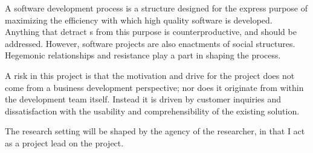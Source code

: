 A software development process is a structure designed for the express purpose of maximizing the efficiency with which high quality software is developed. Anything that detract s from this purpose is counterproductive, and should be addressed. However, software projects are also enactments of social structures. Hegemonic relationships and resistance play a part in shaping the process. 

A risk in this project is that the motivation and drive for the project does not come from a business development perspective; nor does it originate from within the development team itself. Instead it is driven by customer inquiries and dissatisfaction with the usability and comprehensibility of the existing solution. 

The research setting will be shaped by the agency of the researcher, in that I act as a project lead on the project.


